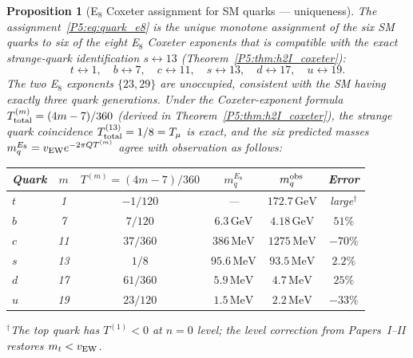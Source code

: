\documentclass[11pt,a4paper]{article}
\newtheorem{proposition}[theorem]{Proposition}
\theoremstyle{definition}
\theoremstyle{remark}
\begin{document}
\begin{proposition}[E$_8$ Coxeter assignment for SM quarks --- uniqueness]
\label{P5:prop:quark_e8_assignment}
The assignment~\eqref{P5:eq:quark_e8} is the unique monotone assignment
of the six SM quarks to six of the eight E$_8$ Coxeter exponents
that is compatible with the exact strange-quark identification
$s\leftrightarrow 13$ (Theorem~\ref{P5:thm:h2I_coxeter}):
\begin{equation}
  t \leftrightarrow 1, \quad
  b \leftrightarrow 7, \quad
  c \leftrightarrow 11, \quad
  s \leftrightarrow 13, \quad
  d \leftrightarrow 17, \quad
  u \leftrightarrow 19.
  \label{P5:eq:quark_e8}
\end{equation}
The two E$_8$ exponents $\{23, 29\}$ are unoccupied, consistent with
the SM having exactly three quark generations.
Under the Coxeter-exponent formula $T_{\rm total}^{(m)} = (4m-7)/360$
(derived in Theorem~\ref{P5:thm:h2I_coxeter}), the strange quark
coincidence $T_{\rm total}^{(13)} = 1/8 = T_\mu$ is \emph{exact},
and the six predicted masses $m_q^{E_8} = v_{\rm EW}e^{-2\pi Q T^{(m)}}$
agree with observation as follows:
\begin{center}
\renewcommand{\arraystretch}{1.25}
\begin{tabular}{lccccc}
\toprule
Quark & $m$ & $T^{(m)}=(4m-7)/360$ & $m_q^{E_8}$ & $m_q^{\rm obs}$ & Error \\
\midrule
$t$ & 1  & $-1/120$ & --- & $172.7\,\mathrm{GeV}$ & large$^\dagger$ \\
$b$ & 7  & $7/120$  & $6.3\,\mathrm{GeV}$  & $4.18\,\mathrm{GeV}$ & $51\%$ \\
$c$ & 11 & $37/360$ & $386\,\mathrm{MeV}$  & $1275\,\mathrm{MeV}$ & $-70\%$ \\
$s$ & 13 & $1/8$    & $95.6\,\mathrm{MeV}$ & $93.5\,\mathrm{MeV}$ & $\mathbf{2.2\%}$ \\
$d$ & 17 & $61/360$ & $5.9\,\mathrm{MeV}$  & $4.7\,\mathrm{MeV}$  & $25\%$ \\
$u$ & 19 & $23/120$ & $1.5\,\mathrm{MeV}$  & $2.2\,\mathrm{MeV}$  & $-33\%$ \\
\bottomrule
\end{tabular}
\end{center}
{\footnotesize $^\dagger$The top quark has $T^{(1)}<0$ at $n=0$ level;
the level correction from Papers~I--II restores $m_t<v_{\rm EW}$.}
\end{proposition}
\end{document}

